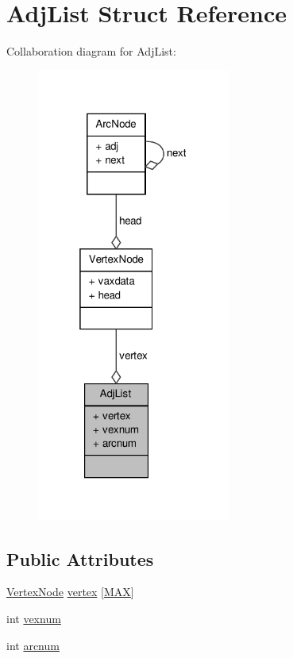 \hypertarget{struct_adj_list}{\section{\-Adj\-List \-Struct \-Reference}
\label{struct_adj_list}
}


\-Collaboration diagram for \-Adj\-List\-:
\nopagebreak
\begin{figure}[H]
\begin{center}
\leavevmode
\includegraphics[width=181pt]{struct_adj_list__coll__graph}
\end{center}
\end{figure}
\subsection*{\-Public \-Attributes}
\begin{DoxyCompactItemize}
\item 
\hyperlink{struct_vertex_node}{\-Vertex\-Node} \hyperlink{struct_adj_list_a6cf73ce6e12e0bec2a54a3c138c7f919}{vertex} \mbox{[}\hyperlink{class_8c_a392fb874e547e582e9c66a08a1f23326}{\-M\-A\-X}\mbox{]}
\item 
int \hyperlink{struct_adj_list_a32fc57f915225dbd6849e8b17518557d}{vexnum}
\item 
int \hyperlink{struct_adj_list_a76226967630f823b2a15095bd4309785}{arcnum}
\end{DoxyCompactItemize}


